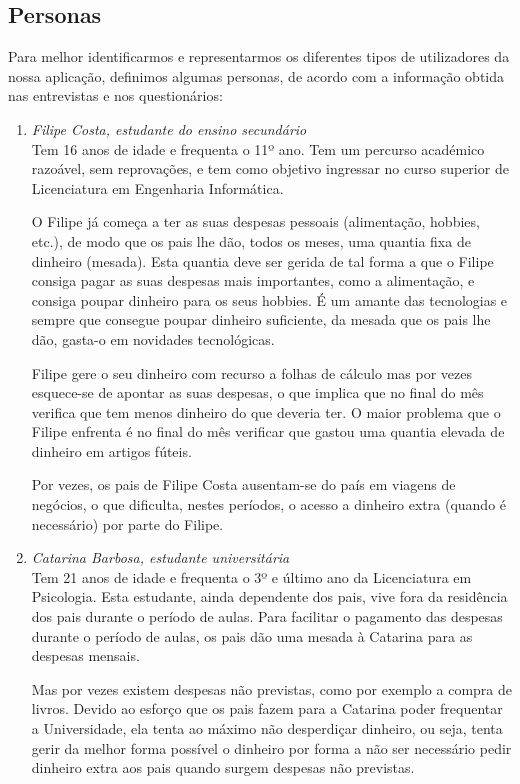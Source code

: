 \documentclass[12pt,a4paper]{article}
\begin{document}
  \subsection{Personas}

    Para melhor identificarmos e representarmos os diferentes tipos de utilizadores da nossa aplicação, definimos algumas personas, de acordo com a informação obtida nas entrevistas e nos questionários:

    \begin{enumerate}
      \item \emph{Filipe Costa, estudante do ensino secundário}\\
            Tem 16 anos de idade e frequenta o 11º ano. Tem um percurso académico razoável, sem reprovações, e tem como objetivo ingressar no curso superior de Licenciatura em Engenharia Informática.

            O Filipe já começa a ter as suas despesas pessoais (alimentação, hobbies, etc.), de modo que os pais lhe dão, todos os meses, uma quantia fixa de dinheiro (mesada). Esta quantia deve ser gerida de tal forma a que o Filipe consiga pagar as suas despesas mais importantes, como a alimentação, e consiga poupar dinheiro para os seus hobbies. É um amante das tecnologias e sempre que consegue poupar dinheiro suficiente, da mesada que os pais lhe dão, gasta-o em novidades tecnológicas.

            Filipe gere o seu dinheiro com recurso a folhas de cálculo mas por vezes esquece-se de apontar as suas despesas, o que implica que no final do mês verifica que tem menos dinheiro do que deveria ter. O maior problema que o Filipe enfrenta é no final do mês verificar que gastou uma quantia elevada de dinheiro em artigos fúteis.

            Por vezes, os pais de Filipe Costa ausentam-se do país em viagens de negócios, o que dificulta, nestes períodos, o acesso a dinheiro extra (quando é necessário) por parte do Filipe.

      \item \emph{Catarina Barbosa, estudante universitária}\\
            Tem 21 anos de idade e frequenta o 3º e último ano da Licenciatura em Psicologia. Esta estudante, ainda dependente dos pais, vive fora da residência dos pais durante o período de aulas. Para facilitar o pagamento das despesas durante o período de aulas, os pais dão uma mesada à Catarina para as despesas mensais.

            Mas por vezes existem despesas não previstas, como por exemplo a compra de livros. Devido ao esforço que os pais fazem para a Catarina poder frequentar a Universidade, ela tenta ao máximo não desperdiçar dinheiro, ou seja, tenta gerir da melhor forma possível o dinheiro por forma a não ser necessário pedir dinheiro extra aos pais quando surgem despesas não previstas.


\end{enumerate}
\end{document}
